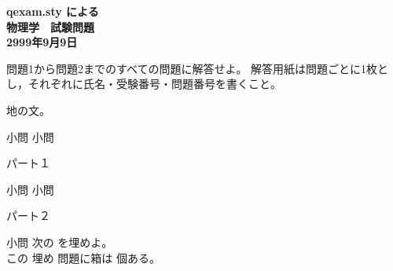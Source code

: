 \documentclass[dvipdfmx,11pt,a4j]{jarticle}
\begin{document}


\begin{center}
	\textbf{\Large  qexam.sty による\\
	\bigskip
	物理学　試験問題}\\
	\bigskip
	\textbf{\large 2999年9月9日}
\end{center}

問題1から問題2までのすべての問題に解答せよ。
解答用紙は問題ごとに1枚とし，それぞれに氏名・受験番号・問題番号を書くこと。

地の文。
\begin{qlist}
	\qitem 小問
	\qitem 小問
\end{qlist}

\begin{qparts}
	\qpart パート１
		\begin{qlist}
			\qitem 小問
			\qitem 小問
		\end{qlist}
	\qpart パート２
		\begin{qlist}
			\qitem 小問
			\qitem 次の \qbox{(a) -- (b)}を埋めよ。\\
				この \qbox{}埋め 問題に箱は \qbox{}個ある。
		\end{qlist}
\end{qparts}
\end{document}
